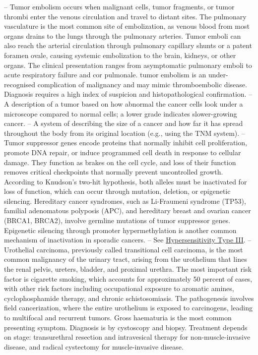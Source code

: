 -- Tumor embolism occurs when malignant cells, tumor fragments, or tumor thrombi enter the venous circulation and travel to distant sites. The pulmonary vasculature is the most common site of embolization, as venous blood from most organs drains to the lungs through the pulmonary arteries. Tumor emboli can also reach the arterial circulation through pulmonary capillary shunts or a patent foramen ovale, causing systemic embolization to the brain, kidneys, or other organs. The clinical presentation ranges from asymptomatic pulmonary emboli to acute respiratory failure and cor pulmonale. tumor embolism is an under-recognised complication of malignancy and may mimic thromboembolic disease. Diagnosis requires a high index of suspicion and histopathological confirmation.
-- A description of a tumor based on how abnormal the cancer cells look under a microscope compared to normal cells; a lower grade indicates slower-growing cancer.
-- A system of describing the size of a cancer and how far it has spread throughout the body from its original location (e.g., using the TNM system).
-- Tumor suppressor genes encode proteins that normally inhibit cell proliferation, promote DNA repair, or induce programmed cell death in response to cellular damage. They function as brakes on the cell cycle, and loss of their function removes critical checkpoints that normally prevent uncontrolled growth. According to Knudson's two-hit hypothesis, both alleles must be inactivated for loss of function, which can occur through mutation, deletion, or epigenetic silencing. Hereditary cancer syndromes, such as Li-Fraumeni syndrome (TP53), familial adenomatous polyposis (APC), and hereditary breast and ovarian cancer (BRCA1, BRCA2), involve germline mutations of tumor suppressor genes. Epigenetic silencing through promoter hypermethylation is another common mechanism of inactivation in sporadic cancers.
-- See \hyperlink{Hypersensitivity Type III}{Hypersensitivity Type III}.
-- Urothelial carcinoma, previously called transitional cell carcinoma, is the most common malignancy of the urinary tract, arising from the urothelium that lines the renal pelvis, ureters, bladder, and proximal urethra. The most important risk factor is cigarette smoking, which accounts for approximately 50 percent of cases, with other risk factors including occupational exposure to aromatic amines, cyclophosphamide therapy, and chronic schistosomiasis. The pathogenesis involves field cancerization, where the entire urothelium is exposed to carcinogens, leading to multifocal and recurrent tumors. Gross haematuria is the most common presenting symptom. Diagnosis is by cystoscopy and biopsy. Treatment depends on stage: transurethral resection and intravesical therapy for non-muscle-invasive disease, and radical cystectomy for muscle-invasive disease.
